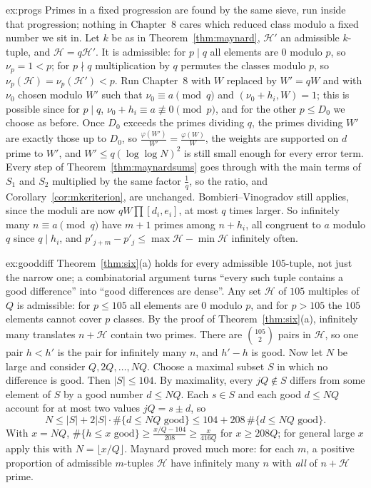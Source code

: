 \begin{solution}{ex:progs}
\idea Primes in a fixed progression are found by the same sieve, run inside that progression; nothing in Chapter~8 cares which reduced class modulo a fixed number we sit in.
\writeup Let $k$ be as in Theorem~\ref{thm:maynard}, $\mathcal H'$ an admissible $k$-tuple, and $\mathcal H=q\mathcal H'$. It is admissible: for $p\mid q$ all elements are $0$ modulo $p$, so $\nu_p=1<p$; for $p\nmid q$ multiplication by $q$ permutes the classes modulo $p$, so $\nu_p(\mathcal H)=\nu_p(\mathcal H')<p$. Run Chapter~8 with $W$ replaced by $W'=qW$ and with $\nu_0$ chosen modulo $W'$ such that $\nu_0\equiv a\pmod q$ and $(\nu_0+h_i,W)=1$; this is possible since for $p\mid q$, $\nu_0+h_i\equiv a\not\equiv0\pmod p$, and for the other $p\le D_0$ we choose as before. Once $D_0$ exceeds the primes dividing $q$, the primes dividing $W'$ are exactly those up to $D_0$, so $\frac{\varphi(W')}{W'}=\frac{\varphi(W)}W$, the weights are supported on $d$ prime to $W'$, and $W'\le q(\log\log N)^2$ is still small enough for every error term. Every step of Theorem~\ref{thm:maynardsums} goes through with the main terms of $S_1$ and $S_2$ multiplied by the same factor $\frac1q$, so the ratio, and Corollary~\ref{cor:mkcriterion}, are unchanged. Bombieri--Vinogradov still applies, since the moduli are now $qW\prod[d_i,e_i]$, at most $q$ times larger. So infinitely many $n\equiv a\pmod q$ have $m+1$ primes among $n+h_i$, all congruent to $a$ modulo $q$ since $q\mid h_i$, and $p'_{j+m}-p'_j\le\max\mathcal H-\min\mathcal H$ infinitely often.
\end{solution}

\begin{solution}{ex:gooddiff}
\idea Theorem~\ref{thm:six}(a) holds for every admissible $105$-tuple, not just the narrow one; a combinatorial argument turns ``every such tuple contains a good difference'' into ``good differences are dense''.
\writeup Any set $\mathcal H$ of $105$ multiples of $Q$ is admissible: for $p\le105$ all elements are $0$ modulo $p$, and for $p>105$ the $105$ elements cannot cover $p$ classes. By the proof of Theorem~\ref{thm:six}(a), infinitely many translates $n+\mathcal H$ contain two primes. There are $\binom{105}2$ pairs in $\mathcal H$, so one pair $h<h'$ is the pair for infinitely many $n$, and $h'-h$ is good.
Now let $N$ be large and consider $Q,2Q,\dots,NQ$. Choose a maximal subset $S$ in which no difference is good. Then $|S|\le104$. By maximality, every $jQ\notin S$ differs from some element of $S$ by a good number $d\le NQ$. Each $s\in S$ and each good $d\le NQ$ account for at most two values $jQ=s\pm d$, so
\[
N\le|S|+2|S|\cdot\#\{d\le NQ\text{ good}\}\le104+208\,\#\{d\le NQ\text{ good}\}.
\]
With $x=NQ$, $\#\{h\le x\text{ good}\}\ge\frac{x/Q-104}{208}\ge\frac x{416Q}$ for $x\ge208Q$; for general large $x$ apply this with $N=\lfloor x/Q\rfloor$. Maynard proved much more: for each $m$, a positive proportion of admissible $m$-tuples $\mathcal H$ have infinitely many $n$ with \emph{all} of $n+\mathcal H$ prime.
\end{solution}

